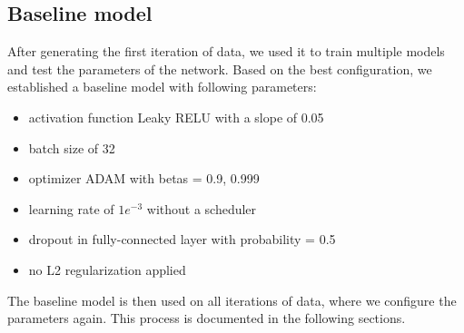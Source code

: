 \subsection{Baseline model}

After generating the first iteration of data, we used it to train multiple models and test the parameters of the network. Based on the best configuration, we established a baseline model with following parameters:

\begin{itemize}
    \setlength\itemsep{1px}
    \item activation function Leaky RELU with a slope of 0.05 
    \item batch size of 32
    \item optimizer ADAM with betas = 0.9, 0.999
    \item learning rate of $1e^{-3}$ without a scheduler
    \item dropout in fully-connected layer with probability = 0.5
    \item no L2 regularization applied
\end{itemize}

The baseline model is then used on all iterations of data, where we configure the parameters again. This process is documented in the following sections. 